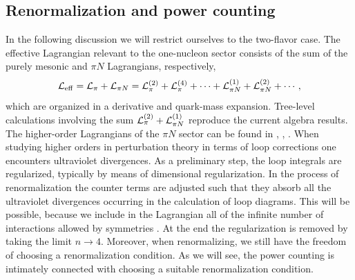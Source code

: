 \documentclass[twoside,12pt]{article}
\begin{document}
\subsection{Renormalization and power counting}
  In the following discussion we will restrict ourselves to the two-flavor case.
  The effective Lagrangian relevant to the one-nucleon sector
consists of the sum of the purely mesonic and $\pi N$ Lagrangians,
respectively,
\begin{equation}
\label{4:2:full_lagrangian}
{\cal L}_{\rm eff}
={\cal L}_{\pi}+{\cal L}_{\pi N}
={\cal L}_\pi^{(2)}+{\cal L}_\pi^{(4)}+\cdots
+{\cal L}_{\pi N}^{(1)}+{\cal L}_{\pi N}^{(2)}
+\cdots,
\end{equation}
which are organized in a derivative and quark-mass expansion.
   Tree-level calculations involving the sum ${\cal L}_\pi^{(2)}+{\cal L}_{\pi N}^{(1)}$
reproduce the current algebra results.
   The higher-order Lagrangians of the $\pi N$ sector can be found in \cite{Gasser:1987rb},
\cite{Ecker:1995rk}, \cite{Fettes:2000gb}.
   When studying higher orders in perturbation theory in terms of loop corrections one encounters
ultraviolet divergences.
   As a preliminary step, the loop integrals are regularized,
typically by means of dimensional regularization.
   In the process of renormalization the
counter terms are adjusted such that they absorb all the ultraviolet
divergences occurring in the calculation of loop diagrams.
   This will be possible, because we include in the Lagrangian all
of the infinite number of interactions allowed by symmetries
\cite{Weinberg:1995mt}.
   At the end the regularization is removed by taking the limit
$n\to 4$.
   Moreover, when renormalizing, we still have the freedom of choosing
a renormalization condition.
   As we will see, the power counting is intimately connected with choosing a suitable
renormalization condition.
\end{document}
